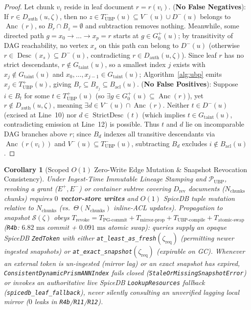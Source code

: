 \documentclass[conference]{IEEEtran}
\newtheorem{corollary}{Corollary}
\begin{document}
\begin{proof}
Let chunk $v_i$ reside in leaf document $r = r(v_i)$. (\textbf{No False Negatives}): If $r \in D_{\text{auth}}(u, \zeta)$, then no $z \in T_{\text{UBP}}^-(u) \subseteq V^-(u) \cup D^-(u)$ belongs to $\operatorname{Anc}(r)$, so $B_r \cap B_z = \emptyset$ and subtraction removes nothing. Meanwhile, some directed path $g = x_0 \to \dots \to x_p = r$ starts at $g \in G_0^+(u)$; by transitivity of DAG reachability, no vertex $x_s$ on this path can belong to $D^-(u)$ (otherwise $r \in \operatorname{Desc}(x_s) \subseteq D^-(u)$, contradicting $r \in D_{\text{auth}}(u,\zeta)$). Since leaf $r$ has no strict descendants, $r \notin G_{\text{taint}}(u)$, so a smallest index $j$ exists with $x_j \notin G_{\text{taint}}(u)$ and $x_0, \dots, x_{j-1} \in G_{\text{taint}}(u)$; Algorithm~\ref{alg:ubp} emits $x_j \in T_{\text{UBP}}^+(u)$, giving $B_r \subseteq B_{x_j} \subseteq B_{\text{acl}}(u)$. (\textbf{No False Positives}): Suppose $i \in B_t$ for some $t \in T_{\text{UBP}}^+(u)$ (so $\exists g \in G_0^+(u) \subseteq \operatorname{Anc}(r)$), yet $r \notin D_{\text{auth}}(u, \zeta)$, meaning $\exists d \in V^-(u) \cap \operatorname{Anc}(r)$. Neither $t \in D^-(u)$ (excised at Line~10) nor $d \in \operatorname{StrictDesc}(t)$ (which implies $t \in G_{\text{taint}}(u)$, contradicting emission at Line~12) is possible. Thus $t$ and $d$ lie on incomparable DAG branches above $r$; since $B_d$ indexes all transitive descendants via $\operatorname{Anc}(r(v_i))$ and $V^-(u) \subseteq T_{\text{UBP}}^-(u)$, subtracting $B_d$ excludes $i \notin B_{\text{acl}}(u)$.
\end{proof}

\begin{corollary}[Scoped $O(1)$ Zero-Write Edge Mutation \& Snapshot Revocation Consistency]
\label{cor:revocation}
Under Ingest-Time Immutable Lineage Stamping and $\mathcal{P}_{\text{UBP}}$, revoking a grant ($E^+, E^-$) or container subtree covering $D_{\text{rev}}$ documents ($N_{\text{chunks}}$ chunks) requires \textbf{$0$ vector-store writes} and $O(1)$ SpiceDB tuple mutation relative to $N_{\text{chunks}}$ (vs.\ $\Theta(N_{\text{chunks}})$ inline-ACL updates). Propagation to snapshot $\mathcal{S}(\zeta)$ obeys $T_{\text{revoke}} = T_{\text{PG-commit}} + T_{\text{mirror-prop}} + T_{\text{UBP-compile}} + T_{\text{atomic-swap}}$ (\texttt{R4b}: $6.82\text{ ms}$ commit + $0.091\text{ ms}$ atomic swap): queries supply an opaque SpiceDB \texttt{ZedToken} with either \texttt{at\_least\_as\_fresh}$(\zeta_{\text{req}})$ (permitting newer ingested snapshots) or \texttt{at\_exact\_snapshot}$(\zeta_{\text{req}})$ (expirable on GC). Whenever an external token is un-ingested (mirror lag) or an exact snapshot has expired, \texttt{ConsistentDynamicPrismANNIndex} fails closed (\texttt{StaleOrMissingSnapshotError}) or invokes an authoritative live SpiceDB \texttt{LookupResources} fallback (\texttt{spicedb\_leaf\_fallback}), never silently consulting an unverified lagging local mirror ($0$ leaks in \texttt{R4b}/\texttt{R11}/\texttt{R12}).
\end{corollary}
\end{document}

